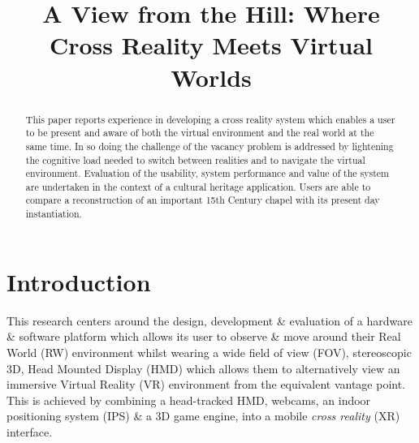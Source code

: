 \documentclass[conference]{acmsiggraph}
\title{A View from the Hill: Where Cross Reality Meets Virtual Worlds}
\author{}
\begin{document}

\maketitle

\begin{abstract}
This paper reports experience in developing a cross reality system which enables a user to be present and aware of both the virtual environment and the real world at the same time. In so doing the challenge of the vacancy problem is addressed by lightening the cognitive load needed to switch between realities and to navigate the virtual environment. Evaluation of the usability, system performance and value of the system are undertaken in the context of a cultural heritage application. Users are able to compare a reconstruction of an important 15th Century chapel with its present day instantiation.


\end{abstract}

\begin{CRcatlist}
\end{CRcatlist}

\keywordlist


\TOGlinkslist


\copyrightspace

\section{Introduction}
This research centers around the design, development \& evaluation of a hardware \& software platform which allows its user to observe \& move around their Real World (RW) environment whilst wearing a wide field of view (FOV), stereoscopic 3D, Head Mounted Display (HMD) which allows them to alternatively view an immersive Virtual Reality (VR) environment from the equivalent vantage point. This is achieved by combining a head-tracked HMD, webcams, an indoor positioning system (IPS) \& a 3D game engine, into a mobile \textit{cross reality} (XR) interface.
\end{document}

